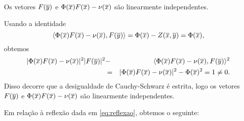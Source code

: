 \begin{lema}
Os vetores $F(\overline{y})$ e $ \Phi(\overline{x}) F(\overline{x}) - \nu(\overline{x}) $ são linearmente independentes.
\end{lema}
\begin{demonstracao}
Usando a identidade
\[
\langle \Phi(\overline{x}) F(\overline{x}) - \nu(\overline{x}), F(\overline{y}) \rangle = 
\Phi(\overline{x}) - Z(\overline{x},\overline{y}) = \Phi(\overline{x}),
\]
obtemos
\begin{eqnarray*}
| \Phi(\overline{x}) F(\overline{x}) - \nu(\overline{x}) |^2 | F(\overline{y}) |^2 &-& 
\langle \Phi(\overline{x}) F(\overline{x}) - \nu(\overline{x}), F(\overline{y}) \rangle^2 \\
&=& | \Phi(\overline{x}) F(\overline{x}) - \nu(\overline{x}) |^2 - \Phi(\overline{x})^2 = 1 \neq 0.
\end{eqnarray*}
Disso decorre que a desigualdade de Cauchy-Schwarz \'e estrita,
logo os vetores $F(\overline{y})$ e $\Phi(\overline{x})F(\overline{x})-\nu(\overline{x})$
s\~ao linearmente independentes.
\end{demonstracao}

Em rela\c c\~ao \`a reflex\~ao dada em \eqref{eq:reflexao}, obtemos o
seguinte:

